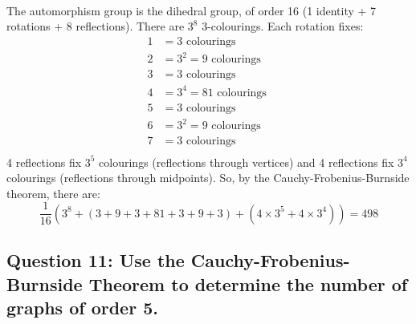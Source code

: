 \documentclass[letterpaper, 11pt]{article}
\newcommand{\1}{\mathds{1}}	%
\theoremstyle{definition}
\begin{document}
~\\
The automorphism group is the dihedral group, of order 16 (1 identity + 7 rotations + 8 reflections). There are $3^8$ 3-colourings. Each rotation fixes:
\begin{align*}
  1 &= 3 \text{ colourings } \\ 
  2 &= 3^2 = 9 \text{ colourings } \\ 
  3 &= 3 \text{ colourings } \\ 
  4 &= 3^4 = 81 \text{ colourings } \\ 
  5 &= 3 \text{ colourings } \\ 
  6 &= 3^2 = 9 \text{ colourings } \\ 
  7 &= 3 \text{ colourings } \\ 
\end{align*}
4 reflections fix $3^5$ colourings (reflections through vertices) and 4 reflections fix $3^4$ colourings (reflections through midpoints). So, by the Cauchy-Frobenius-Burnside theorem, there are: \[
\frac{1}{16} (3^8 + (3 + 9 + 3 + 81 + 3 + 9 + 3) + (4 \times 3^5 + 4 \times 3^4)) = 498
\]

\subsection*{Question 11: Use the Cauchy-Frobenius-Burnside Theorem to determine the number of graphs of order 5.}
\end{document}
